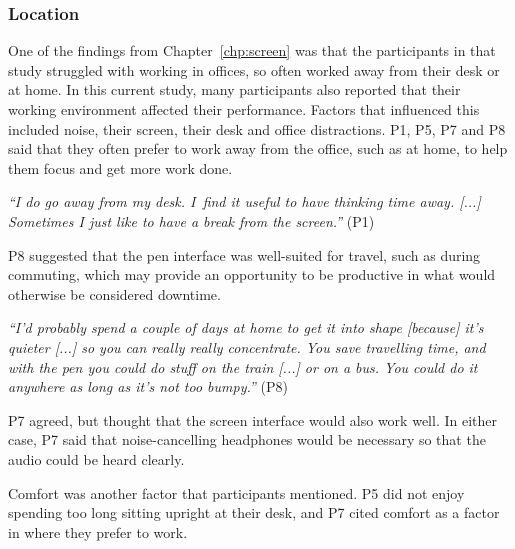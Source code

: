 

\subsubsection{Location}

One of the findings from Chapter~\ref{chp:screen} was that the participants in that study struggled with working in
offices, so often worked away from their desk or at home. In this current study, many participants also reported that
their working environment affected their performance. Factors that influenced this included noise, their screen, their
desk and office distractions. P1, P5, P7 and P8 said that they often prefer to work away from the office, such as at
home, to help them focus and get more work done.

\textit{``I do go away from my desk. I find it useful to have thinking time away. [...] Sometimes I just like to have a
break from the screen.''} (P1)

P8 suggested that the pen interface was well-suited for travel, such as during commuting, which may provide an
opportunity to be productive in what would otherwise be considered downtime.

\textit{``I'd probably spend a couple of days at home to get it into shape [because] it's quieter [...]
  so you can really really concentrate. You save travelling time, and with the pen you could do stuff on the train [...]
or on a bus. You could do it anywhere as long as it's not too bumpy.''} (P8)

P7 agreed, but thought that the screen interface would also work well. In either case, P7 said that noise-cancelling
headphones would be necessary so that the audio could be heard clearly.

Comfort was another factor that participants mentioned. P5 did not enjoy spending too long sitting upright at their
desk, and P7 cited comfort as a factor in where they prefer to work.

